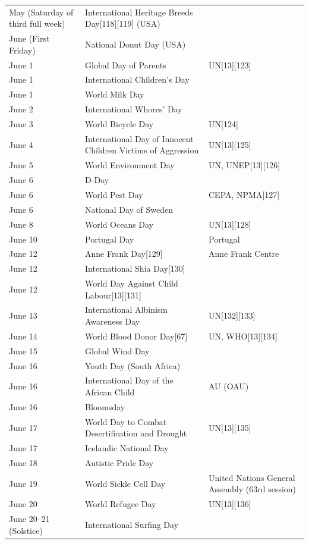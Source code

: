 \documentclass[
]{book}
\begin{document}
\begin{longtable}[t]{>{\raggedright\arraybackslash}p{8em}>{\raggedright\arraybackslash}p{20em}>{\raggedright\arraybackslash}p{12em}}
May (Saturday of third full week) & International Heritage Breeds Day[118][119] (USA) & \\
June (First Friday) & National Donut Day (USA) & \\
June 1 & Global Day of Parents & UN[13][123]\\
\addlinespace
June 1 & International Children's Day & \\
June 1 & World Milk Day & \\
June 2 & International Whores' Day & \\
June 3 & World Bicycle Day & UN[124]\\
June 4 & International Day of Innocent Children Victims of Aggression & UN[13][125]\\
\addlinespace
June 5 & World Environment Day & UN, UNEP[13][126]\\
June 6 & D-Day & \\
June 6 & World Pest Day & CEPA, NPMA[127]\\
June 6 & National Day of Sweden & \\
June 8 & World Oceans Day & UN[13][128]\\
\addlinespace
June 10 & Portugal Day & Portugal\\
June 12 & Anne Frank Day[129] & Anne Frank Centre\\
June 12 & International Shia Day[130] & \\
June 12 & World Day Against Child Labour[13][131] & \\
June 13 & International Albinism Awareness Day & UN[132][133]\\
\addlinespace
June 14 & World Blood Donor Day[67] & UN, WHO[13][134]\\
June 15 & Global Wind Day & \\
June 16 & Youth Day (South Africa) & \\
June 16 & International Day of the African Child & AU (OAU)\\
June 16 & Bloomsday & \\
\addlinespace
June 17 & World Day to Combat Desertification and Drought & UN[13][135]\\
June 17 & Icelandic National Day & \\
June 18 & Autistic Pride Day & \\
June 19 & World Sickle Cell Day & United Nations General Assembly (63rd session)\\
June 20 & World Refugee Day & UN[13][136]\\
\addlinespace
June 20–21 (Solstice) & International Surfing Day & \\

\end{longtable}
\end{document}
